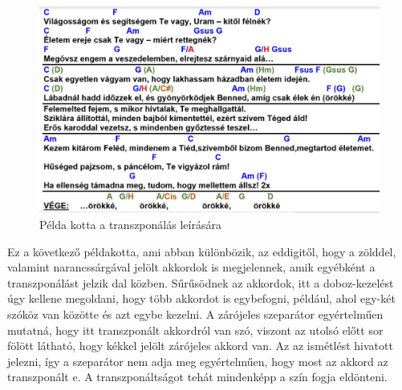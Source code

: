 \begin{figure}[h]
	\includegraphics[scale=0.3]{images/samples/27_zsoltar.jpg}
	\caption{Példa kotta a transzponálás leírására}
	\label{fig:song2}
\end{figure}
Ez a következő példakotta, ami abban különbözik, az eddigitől, hogy a zölddel, valamint narancssárgával jelölt akkordok is megjelennek, amik egyébként a transzponálást jelzik dal közben. Sűrűsödnek az akkordok, itt a doboz-kezelést úgy kellene megoldani, hogy több akkordot is egybefogni, például, ahol egy-két szóköz van közötte és azt egybe kezelni. A zárójeles szeparátor egyértelműen mutatná, hogy itt transzponált akkordról van szó, viszont az utolsó előtt sor fölött látható, hogy kékkel jelölt zárójeles akkord van. Az az ismétlést hivatott jelezni, így a szeparátor nem adja meg egyértelműen, hogy most az akkord az transzponált e. A transzponáltságot tehát mindenképp a szín fogja eldönteni.

